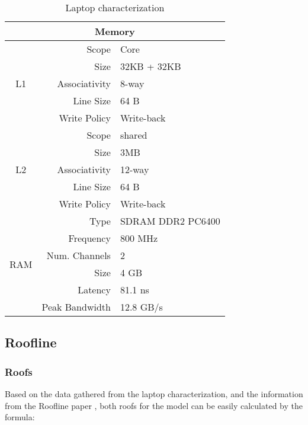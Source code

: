 \documentclass[twocolumn,10pt]{scrartcl}
\begin{document}
\begin{table}[!htp]
	\begin{center}
		\begin{tabular}{|c|rl|}
			\multicolumn{3}{c}{\textbf{Memory}}		\\
			\hline
			\multicolumn{1}{|c|}{\multirow{5}{*}{L1}}
				&	Scope			&	Core		\\
				&	Size			&	32KB + 32KB	\\
				&	Associativity	&	8-way		\\
				&	Line Size		&	64 B		\\
				&	Write Policy	&	Write-back	\\
			\hline
			\multicolumn{1}{|c|}{\multirow{5}{*}{L2}}
				&	Scope			&	shared		\\
				&	Size			&	3MB			\\
				&	Associativity	&	12-way		\\
				&	Line Size		&	64 B		\\
				&	Write Policy	&	Write-back	\\
			\hline
			\multicolumn{1}{|c|}{\multirow{6}{*}{RAM}}
				&	Type			&	SDRAM DDR2 PC6400	\\
				&	Frequency		&	800 MHz				\\
				&	Num. Channels	&	2					\\
				&	Size			&	4 GB				\\
				&	Latency			&	81.1 ns				\\
				&	Peak Bandwidth	&	12.8 GB/s			\\
			\hline			
		\end{tabular}
	\end{center}
	\caption{Laptop characterization \label{tab:profile}}
\end{table}

\subsection{Roofline}
\label{ref:2.2}

\subsubsection{Roofs}

Based on the data gathered from the laptop characterization, and the information from the Roofline paper \cite{roofline}, both roofs for the model can be easily calculated by the formula:
\end{document}
